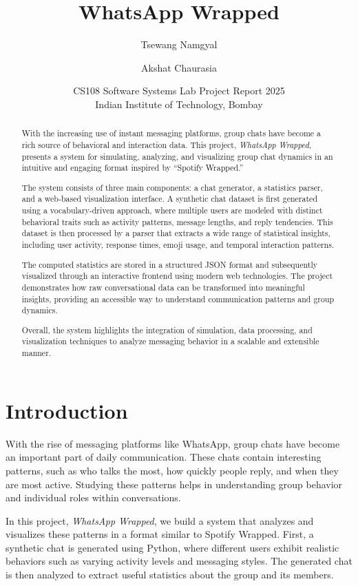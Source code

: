 \documentclass[11pt,a4paper]{article}
\title{WhatsApp Wrapped}
\author{
    Tsewang Namgyal \and Akshat Chaurasia\\
    }
\date{
    CS108 Software Systems Lab Project Report 2025\\
    Indian Institute of Technology, Bombay
}
\begin{document}
\maketitle

\newpage
\begin{abstract}
With the increasing use of instant messaging platforms, group chats have become a rich source of behavioral and interaction data. This project, \textit{WhatsApp Wrapped}, presents a system for simulating, analyzing, and visualizing group chat dynamics in an intuitive and engaging format inspired by “Spotify Wrapped.”

The system consists of three main components: a chat generator, a statistics parser, and a web-based visualization interface. A synthetic chat dataset is first generated using a vocabulary-driven approach, where multiple users are modeled with distinct behavioral traits such as activity patterns, message lengths, and reply tendencies. This dataset is then processed by a parser that extracts a wide range of statistical insights, including user activity, response times, emoji usage, and temporal interaction patterns.

The computed statistics are stored in a structured JSON format and subsequently visualized through an interactive frontend using modern web technologies. The project demonstrates how raw conversational data can be transformed into meaningful insights, providing an accessible way to understand communication patterns and group dynamics.

Overall, the system highlights the integration of simulation, data processing, and visualization techniques to analyze messaging behavior in a scalable and extensible manner.
\end{abstract}

\newpage
\tableofcontents
\newpage

\section{Introduction}
With the rise of messaging platforms like WhatsApp, group chats have become an important part of daily communication. These chats contain interesting patterns, such as who talks the most, how quickly people reply, and when they are most active. Studying these patterns helps in understanding group behavior and individual roles within conversations.

In this project, \textit{WhatsApp Wrapped}, we build a system that analyzes and visualizes these patterns in a format similar to Spotify Wrapped\cite{spotifywrapped}. First, a synthetic chat is generated using Python\cite{python}, where different users exhibit realistic behaviors such as varying activity levels and messaging styles. The generated chat is then analyzed to extract useful statistics about the group and its members.
\end{document}
